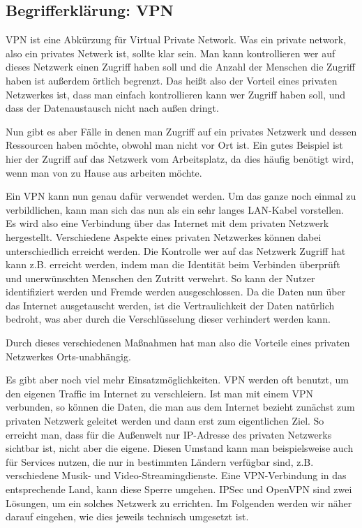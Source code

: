 \documentclass[12pt]{scrartcl}
\begin{document}
\subsection{Begrifferklärung: VPN}
VPN ist eine Abkürzung für Virtual Private Network. Was ein private network, also ein privates Netwerk ist, sollte klar sein. Man kann kontrollieren wer auf dieses Netzwerk einen Zugriff haben soll und die Anzahl der Menschen die Zugriff haben ist außerdem örtlich begrenzt. Das heißt also der Vorteil eines privaten Netzwerkes ist, dass man einfach kontrollieren kann wer Zugriff haben soll, und dass der Datenaustausch nicht nach außen dringt.

Nun gibt es aber Fälle in denen man Zugriff auf ein privates Netzwerk und dessen Ressourcen haben möchte, obwohl man nicht vor Ort ist. Ein gutes Beispiel ist hier der Zugriff auf das Netzwerk vom Arbeitsplatz, da dies häufig benötigt wird, wenn man von zu Hause aus arbeiten möchte.

Ein VPN kann nun genau dafür verwendet werden. Um das ganze noch einmal zu verbildlichen, kann man sich das nun als ein sehr langes LAN-Kabel vorstellen. Es wird also eine Verbindung über das Internet mit dem privaten Netzwerk hergestellt. Verschiedene Aspekte eines privaten Netzwerkes können dabei unterschiedlich erreicht werden. Die Kontrolle wer auf das Netzwerk Zugriff hat kann z.B. erreicht werden, indem man die Identität beim Verbinden überprüft und unerwünschten Menschen den Zutritt verwehrt. So kann der Nutzer identifiziert werden und Fremde werden ausgeschlossen. Da die Daten nun über das Internet ausgetauscht werden, ist die Vertraulichkeit der Daten natürlich bedroht, was aber durch die Verschlüsselung dieser verhindert werden kann.

Durch dieses verschiedenen Maßnahmen hat man also die Vorteile eines privaten Netzwerkes Orts-unabhängig.

Es gibt aber noch viel mehr Einsatzmöglichkeiten. 
VPN werden oft benutzt, um den eigenen Traffic im Internet zu verschleiern. Ist man mit einem VPN verbunden, so können die Daten, die man aus dem Internet bezieht zunächst zum privaten Netzwerk geleitet werden und dann erst zum eigentlichen Ziel. So erreicht man, dass für die Außenwelt nur IP-Adresse des privaten Netzwerks sichtbar ist, nicht aber die eigene.
Diesen Umstand kann man beispielsweise auch für Services nutzen, die nur in bestimmten Ländern verfügbar sind, z.B. verschiedene Musik- und Video-Streamingdienste. Eine VPN-Verbindung in das entsprechende Land, kann diese Sperre umgehen. 
IPSec und OpenVPN sind zwei Lösungen, um ein solches Netzwerk zu errichten. Im Folgenden werden wir näher darauf eingehen, wie dies jeweils technisch umgesetzt ist.
\end{document}
